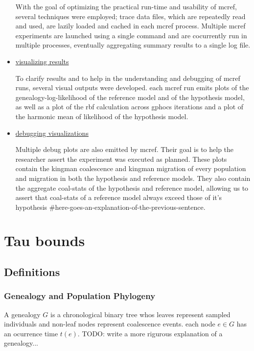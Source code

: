 \documentclass[11pt]{article}
\newcommand{\1}{\mathbbm{1}}
\begin{document}
\begin{itemize}
With the goal of optimizing the practical run-time and usability of mcref, several techniques were employed; trace data files, which are repeatedly read and used, are lazily loaded and cached in each mcref process. Multiple mcref experiments are launched using a single command and are cocurrently run in multiple processes, eventually aggregating summary results to a single log file. 

\item \underline{visualizing results}

To clarify results and to help in the understanding and debugging of mcref runs, several visual outputs were developed. each mcref run emits plots of the genealogy-log-likelihood of the reference model and of the hypothesis model, as well as a plot of the rbf calculation across gphocs iterations and a plot of the harmonic mean of likelihood of the hypothesis model.

\item \underline{debugging visualizations}

Multiple debug plots are also emitted by mcref. Their goal is to help the researcher assert the experiment was executed as planned. These plots contain the kingman coalescence and kingman migration of every population and migration in both the hypothesis and reference models. They also contain the aggregate coal-stats of the hypothesis and reference model, allowing us to assert that coal-stats of a reference model always exceed those of it's hypothesis \#here-goes-an-explanation-of-the-previous-sentence. 
\end{itemize}



\section{Tau bounds}

\subsection{Definitions}

\subsubsection{Genealogy and Population Phylogeny}
A genealogy $G$ is a chronological binary tree whos leaves represent sampled individuals and non-leaf nodes represent coalescence events. each node $e \in G$ has an ocurrence time $t(e)$. TODO: write a more rigurous explanation of a genealogy...
\end{document}
